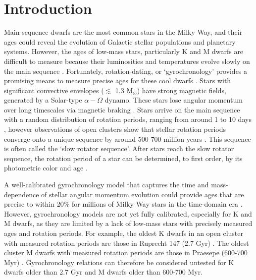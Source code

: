 \section{Introduction}

Main-sequence dwarfs are the most common stars in the Milky Way, and their
ages could reveal the evolution of Galactic stellar populations and planetary
systems.
However, the ages of low-mass stars, particularly K and M dwarfs are difficult
to measure because their luminosities and temperatures evolve slowly on the
main sequence \citep[see][for a review of stellar ages]{soderblom2010}.
Fortunately, rotation-dating, or `gyrochronology’ provides a promising means
to measure precise ages for these cool dwarfs
\citep[\eg][]{schatzman1962, weber1967, kraft1967, skumanich1972, kawaler1988,
pinsonneault1989, barnes2003, barnes2007, mamajek2008, barnes2010, meibom2011,
epstein2014, meibom2015, vansaders2016, vansaders2018, claytor2020}.
Stars with significant convective envelopes ($\lesssim$ 1.3 M$_\odot$) have
strong magnetic fields, generated by a Solar-type $\alpha-\Omega$ dynamo.
These stars lose angular momentum over long timescales via magnetic braking
\citep[\eg][]{schatzman1962, weber1967, kraft1967, skumanich1972, kawaler1988,
pinsonneault1989}.
Stars arrive on the main sequence with a random distribution of rotation
periods, ranging from around 1 to 10 days \citep{rebull2019}, however
observations of open clusters show that stellar rotation periods
converge onto a unique sequence by around 500-700 million years
\citep[\eg][]{irwin2009, gallet2013}.
This sequence is often called the `slow rotator sequence'.
After stars reach the slow rotator sequence, the rotation period of a star can
be determined, to first order, by its photometric color and age
\citep[\eg]{barnes2003, barnes2007, barnes2010, meibom2011, meibom2015}.

A well-calibrated gyrochronology model that captures the time and
mass-dependence of stellar angular momentum evolution could provide ages that
are precise to within 20\% for millions of Milky Way stars in the time-domain
era \citep{epstein2014, najita2016, angus2019, claytor2020}.
However, gyrochronology models are not yet fully calibrated, especially for K
and M dwarfs, as they are limited by a lack of low-mass stars with precisely
measured ages and rotation periods.
For example, the oldest K dwarfs in an open cluster with measured rotation
periods are those in Ruprecht 147 (2.7 Gyr) \citep{curtis2020, age_citation}.
The oldest cluster M dwarfs with measured rotation periods are those in
Praesepe (600-700 Myr) \citep{douglas2017, rebull2017, age_citation}.
Gyrochronology relations can therefore be considered untested for K dwarfs
older than 2.7 Gyr and M dwarfs older than 600-700 Myr.

